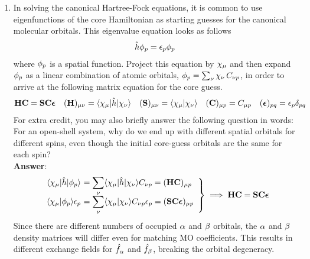 \documentclass[11pt]{article}
\numberwithin{equation}{section}
\begin{document}
\begin{enumerate}
\item
  In solving the canonical Hartree-Fock equations, it is common to use eigenfunctions of the core Hamiltonian as starting guesses for the canonical molecular orbitals.
  This eigenvalue equation looks as follows
  \begin{align*}
    \hat{h}
    \phi _{p}
  =
    \epsilon _{p}
    \phi _{p}
  \end{align*}
  where $\phi _p$ is a spatial function.
  Project this equation by $\x_\mu$ and then expand $\phi _p$ as a linear combination of atomic orbitals, $\f_p=\sum_\nu \x_\nu\, C_{\nu p}$, in order to arrive at the following matrix equation for the core guess.
  \begin{align*}
    \bo{H}\bo{C}
  =
    \bo{S}\bo{C}\bm{\ev}
  &&
    (\bo{H})_{\mu\nu}
  =
    \ip{\x_\mu|\op{h}|\x_\nu}
  &&
    (\bo{S})_{\mu\nu}
  =
    \ip{\x_\mu|\x_\nu}
  &&
    (\bo{C})_{\mu p}
  =
    C_{\mu p}
  &&
    (\bm{\ev})_{pq}
  =
    \ev_p\d_{pq}
  \end{align*}
  For extra credit, you may also briefly answer the following question in words: For an open-shell system, why do we end up with different spatial orbitals for different spins, even though the initial core-guess orbitals are the same for each spin?\\[1cm]
  \textbf{Answer}:
  \begin{align*}
  \left.
  \begin{array}{r@{\ }l}
    \ip{\x_\mu|\op{h}|\f_p}
  &=
  \ds{
    \sum_\nu
    \ip{\x_\mu|\op{h}|\x_\nu}
    C_{\nu p}
  }
  =
    (\bo{H}\bo{C})_{\mu p}
  \\
    \ip{\x_\mu|\f_p}
    \ev_p
  &=
  \ds{
    \sum_\nu
    \ip{\x_\mu|\x_\nu}
    C_{\nu p}
    \ev_p
  }
  =
    (\bo{S}\bo{C}\bm{\ev})_{\mu p}
  \end{array}
  \right\}
  \implies
    \bo{H}\bo{C}
  =
    \bo{S}\bo{C}\bm{\ev}
  \end{align*}
  Since there are different numbers of occupied $\alpha $ and $\beta $ orbitals, the $\alpha $ and $\beta $ density matrices will differ even for matching MO coefficients.
  This results in different exchange fields for $\hat{f}_{\alpha }$ and $\hat{f}_{\beta }$, breaking the orbital degeneracy.
  


\end{enumerate}
\end{document}
